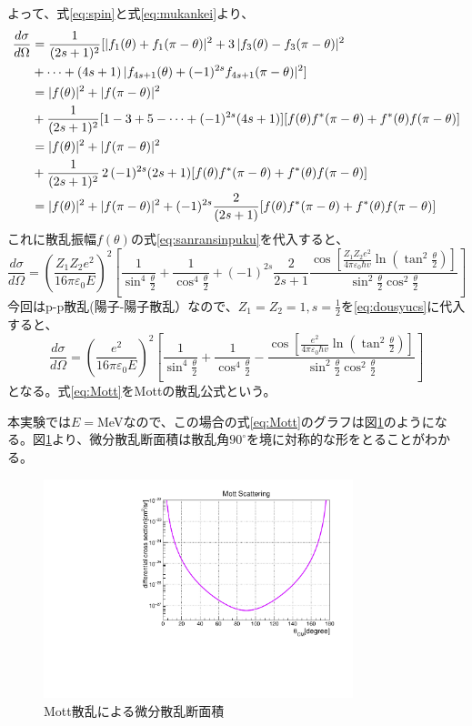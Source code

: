 \documentclass[a4paper,11pt,dvipdfmx]{jsarticle}
\begin{document}
よって、式\eqref{eq:spin}と式\eqref{eq:mukankei}より、
\begin{align}
     \frac{d\sigma}{d\Omega} &= \frac{1}{(2s+1)^{2}}[|f_{1}(\theta)+f_{1}(\pi-\theta)|^{2}+3\,|f_{3}(\theta)-f_{3}(\pi-\theta)|^{2} \notag\\
    &+ \cdots +(4s+1)\,|f_{4s+1}(\theta)+(-1)^{2s}f_{4s+1}(\pi-\theta)|^{2}] \notag\\
 &= |f(\theta)|^2+|f(\pi-\theta)|^2\notag\\
     &+\frac{1}{(2s+1)^{2}}[1-3+5-\cdots+(-1)^{2s}(4s+1)][f(\theta)f^*(\pi-\theta)+f^*(\theta)f(\pi-\theta)] \notag\\
 &= |f(\theta)|^2+|f(\pi-\theta)|^2\notag\\
   &+\frac{1}{(2s+1)^{2}}\,2\,(-1)^{2s}(2s+1)[f(\theta)f^*(\pi-\theta)+f^*(\theta)f(\pi-\theta)] \notag\\
    &= |f(\theta)|^2+|f(\pi-\theta)|^2 +(-1)^{2s}\frac{2}{(2s+1)}[f(\theta)f^*(\pi-\theta)+f^*(\theta)f(\pi-\theta)] 
\end{align}
これに散乱振幅$f(\theta)$の式\eqref{eq:sanransinpuku}を代入すると、
\begin{equation}
   \frac{d\sigma}{d\Omega} = \left(\frac{Z_{1}Z_{2}e^2}{16\pi\varepsilon_{0}E}\right)^{2}\left[\frac{1}{\sin^4\frac{\theta}{2}}+\frac{1}{\cos^4\frac{\theta}{2}}+(-1)^{2s}\frac{2}{2s+1}\frac{\cos[\frac{Z_{1}Z_{2}e^2}{4\pi\varepsilon_{0}\hbar v}\ln(\tan^2\frac{\theta}{2})]}{\sin^2\frac{\theta}{2}\cos^2\frac{\theta}{2}}\right]
   \label{eq:dousyucs}
\end{equation}
今回はp-p散乱(陽子-陽子散乱）なので、$Z_{1}=Z_{2}=1,s=\frac{1}{2}$を\eqref{eq:dousyucs}に代入すると、
\begin{equation}
   \frac{d\sigma}{d\Omega} = \left(\frac{e^2}{16\pi\varepsilon_{0}E}\right)^{2}\left[\frac{1}{\sin^4\frac{\theta}{2}}+\frac{1}{\cos^4\frac{\theta}{2}}-\frac{\cos[\frac{e^2}{4\pi\varepsilon_{0}\hbar v}\ln(\tan^2\frac{\theta}{2})]}{\sin^2\frac{\theta}{2}\cos^2\frac{\theta}{2}}\right]
   \label{eq:Mott}
\end{equation}
となる。式\eqref{eq:Mott}をMottの散乱公式という。

本実験では$E=$\;MeVなので、この場合の式\eqref{eq:Mott}のグラフは図\ref{fig:Mott}のようになる。図\ref{fig:Mott}より、微分散乱断面積は散乱角$90^{\circ}$を境に対称的な形をとることがわかる。
\begin{figure}[htbp]
\centering
\includegraphics[width=9cm]{picture/cstheory/Mott_revise.pdf}
\caption{Mott散乱による微分散乱断面積}
\label{fig:Mott}
\end{figure}
\end{document}
